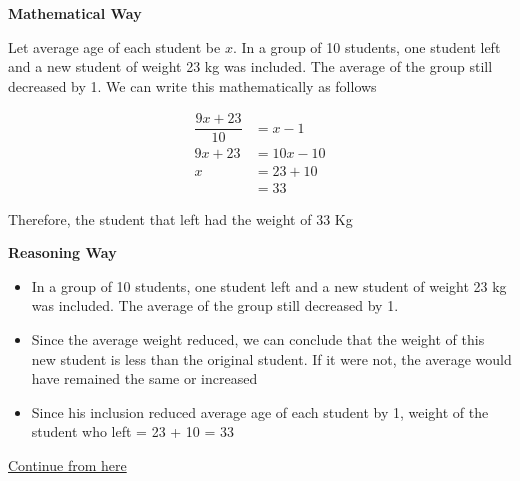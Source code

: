 \begin{multicols}{2}
    \textbf{Mathematical Way}

    Let average age of each student be $x$. In a group of 10 students, one student left and a new student of weight 23 kg was included. The average of the group still decreased by 1. We can write this mathematically as follows 

    \begin{align*}
        \dfrac{9x + 23}{10} &= x - 1 \tag{Weight of 9 students + new included student} \\
        9x + 23 &= 10x - 10 \\
        x &= 23 + 10 \\
        &= 33
    \end{align*}

    Therefore, the student that left had the weight of 33 Kg

    \columnbreak

    \textbf{Reasoning Way}
    \begin{itemize}
        \item In a group of 10 students, one student left and a new student of weight 23 kg was included. The average of the group still decreased by 1.
        \item Since the average weight reduced, we can conclude that the weight of this new student is less than the original student. If it were not, the average would have remained the same or increased
        \item Since his inclusion reduced average age of each student by 1, weight of the student who left = 23 + 10 = 33
    \end{itemize}


\end{multicols}




\href{https://www.youtube.com/watch?v=i3o8REcdEXQ}{Continue from here}